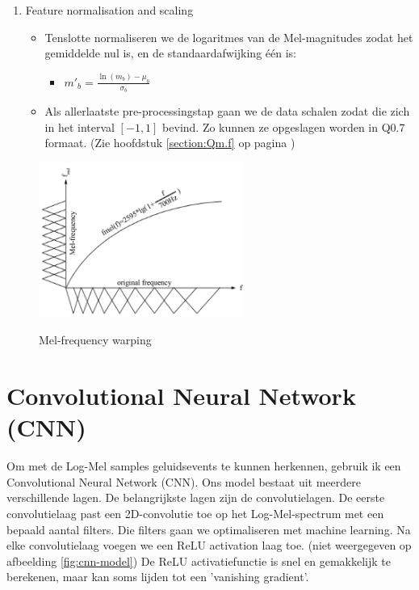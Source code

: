 \begin{no-awa}
\begin{enumerate}
	\item Feature normalisation and scaling
	      \begin{itemize}
		      \item Tenslotte normaliseren we de logaritmes van de Mel-magnitudes zodat het gemiddelde nul is, en de standaardafwijking één is:
		            \begin{itemize}[label={}]
			            \item \(m'_b = \frac{\ln\left( m_b \right) - \mu_b}{\sigma_b}\)
		            \end{itemize}
		      \item Als allerlaatste pre-processingstap gaan we de data schalen zodat die zich in het interval \(\left[ -1,1 \right]\) bevind. Zo kunnen ze opgeslagen worden in Q0.7 formaat. (Zie hoofdstuk \ref{section:Qm.f} op pagina \pageref{section:Qm.f})
	      \end{itemize}
\end{enumerate}
\end{no-awa}


\begin{figure}[ht]
	\centering
	\includegraphics[width=0.6\textwidth]{figuren/Mel-frequency.png}
	\caption{Mel-frequency warping}
	\cite{efficient-feature-extraction}
	\label{fig:Mel-bands}
\end{figure}


\section{Convolutional Neural Network (CNN)}

Om met de Log-Mel samples geluidsevents te kunnen herkennen, gebruik ik een Convolutional Neural Network (CNN). Ons model bestaat uit meerdere verschillende lagen. De belangrijkste lagen zijn de convolutielagen. De eerste convolutielaag past een 2D-convolutie toe op het Log-Mel-spectrum met een bepaald aantal filters. Die filters gaan we optimaliseren met machine learning.
Na elke convolutielaag voegen we een ReLU activation laag toe. (niet weergegeven op afbeelding \ref{fig:cnn-model}) De ReLU activatiefunctie is snel en gemakkelijk te berekenen, \cite{enwiki:relu} maar kan soms lijden tot een 'vanishing gradient'. \cite{enwiki:vanishing-gradient}


